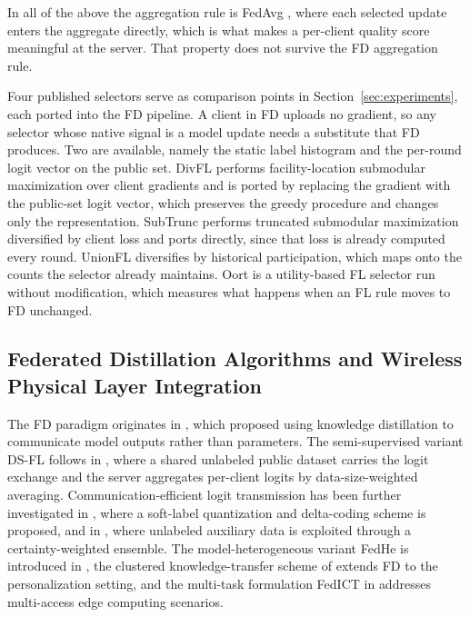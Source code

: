 \documentclass[journal]{IEEEtran}
\newcommand{\rev}[1]{{\color{blue}#1}}
\begin{document}
In all of the above the aggregation rule is FedAvg \cite{mcmahan2017communication}, where each selected update enters the aggregate directly, which is what makes a per-client quality score meaningful at the server. That property does not survive the FD aggregation rule.

\rev{Four published selectors serve as comparison points in Section~\ref{sec:experiments}, each ported into the FD pipeline. A client in FD uploads no gradient, so any selector whose native signal is a model update needs a substitute that FD produces. Two are available, namely the static label histogram and the per-round logit vector on the public set. DivFL \cite{balakrishnan2022divfl} performs facility-location submodular maximization over client gradients and is ported by replacing the gradient with the public-set logit vector, which preserves the greedy procedure and changes only the representation. SubTrunc \cite{castillo2024subtrunc} performs truncated submodular maximization diversified by client loss and ports directly, since that loss is already computed every round. UnionFL \cite{castillo2024unionfl} diversifies by historical participation, which maps onto the counts the selector already maintains. Oort \cite{lai2021oort} is a utility-based FL selector run without modification, which measures what happens when an FL rule moves to FD unchanged.}

\subsection{Federated Distillation Algorithms and Wireless Physical Layer Integration}
\label{ssec:rw-fd}

The FD paradigm originates in \cite{jeong2018communication}, which proposed using knowledge distillation \cite{hinton2015distilling} to communicate model outputs rather than parameters. The semi-supervised variant DS-FL follows in \cite{itahara2023distillation}, where a shared unlabeled public dataset carries the logit exchange and the server aggregates per-client logits by data-size-weighted averaging. Communication-efficient logit transmission has been further investigated in \cite{sattler2022cfd}, where a soft-label quantization and delta-coding scheme is proposed, and in \cite{sattler2023fedaux}, where unlabeled auxiliary data is exploited through a certainty-weighted ensemble. The model-heterogeneous variant FedHe is introduced in \cite{chan2021fedhe}, the clustered knowledge-transfer scheme of \cite{cho2023clustered} extends FD to the personalization setting, and the multi-task formulation FedICT in \cite{wu2024fedict} addresses multi-access edge computing scenarios.
\end{document}

